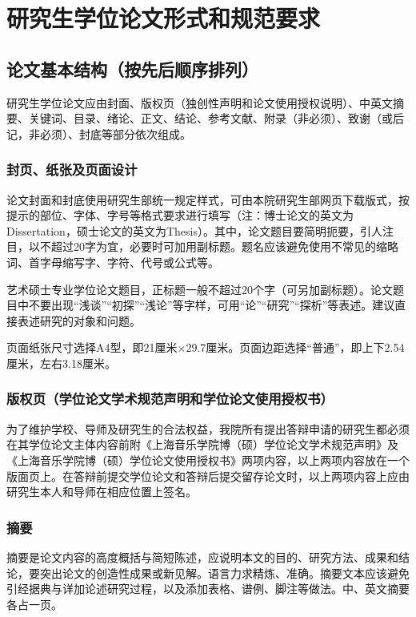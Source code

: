 
\chapter{研究生学位论文形式和规范要求}

\section{论文基本结构（按先后顺序排列）}

研究生学位论文应由封面、版权页（独创性声明和论文使用授权说明）、中英文摘要、关键词、目录、绪论、正文、结论、参考文献、附录（非必须）、致谢（或后记，非必须）、封底等部分依次组成。

\subsection{封页、纸张及页面设计}

论文封面和封底使用研究生部统一规定样式，可由本院研究生部网页下载版式，按提示的部位、字体、字号等格式要求进行填写（注：博士论文的英文为Dissertation，硕士论文的英文为Thesis）。其中，论文题目要简明扼要，引人注目，以不超过20字为宜，必要时可加用副标题。题名应该避免使用不常见的缩略词、首字母缩写字、字符、代号或公式等。

艺术硕士专业学位论文题目，正标题一般不超过20个字（可另加副标题）。论文题目中不要出现“浅谈”“初探”“浅论”等字样，可用“论”“研究”“探析”等表述。建议直接表述研究的对象和问题。

页面纸张尺寸选择A4型，即21厘米×29.7厘米。页面边距选择“普通”，即上下2.54厘米，左右3.18厘米。

\subsection{版权页（学位论文学术规范声明和学位论文使用授权书）}

为了维护学校、导师及研究生的合法权益，我院所有提出答辩申请的研究生都必须在其学位论文主体内容前附《上海音乐学院博（硕）学位论文学术规范声明》及《上海音乐学院博（硕）学位论文使用授权书》两项内容，以上两项内容放在一个版面页上。在答辩前提交学位论文和答辩后提交留存论文时，以上两项内容上应由研究生本人和导师在相应位置上签名。

\subsection{摘要}

摘要是论文内容的高度概括与简短陈述，应说明本文的目的、研究方法、成果和结论，要突出论文的创造性成果或新见解。语言力求精炼、准确。摘要文本应该避免引经据典与详加论述研究过程，以及添加表格、谱例、脚注等做法。中、英文摘要各占一页。

